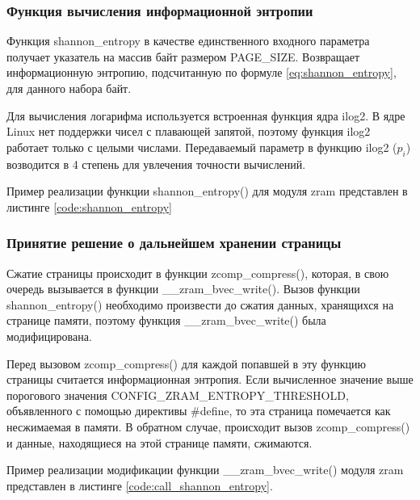 \subsubsection{Функция вычисления информационной энтропии}

Функция shannon\_entropy в качестве единственного входного параметра получает указатель на массив байт размером PAGE\_SIZE. Возвращает информационную энтропию, подсчитанную по формуле \ref{eq:shannon_entropy}, для данного набора байт.

Для вычисления логарифма используется встроенная функция ядра ilog2. В ядре Linux нет поддержки чисел с плавающей запятой, поэтому функция ilog2 работает только с целыми числами. Передаваемый параметр в функцию ilog2 ($p_{i}$) возводится в 4 степень для увлечения точности вычислений.

Пример реализации функции shannon\_entropy() для модуля zram представлен в листинге \ref{code:shannon_entropy}


\subsubsection{Принятие решение о дальнейшем хранении страницы}

Сжатие страницы происходит в функции zcomp\_compress(), которая, в свою очередь вызывается в функции \_\_zram\_bvec\_write(). Вызов функции\\ shannon\_entropy() необходимо произвести до сжатия данных, хранящихся на странице памяти, поэтому функция \_\_zram\_bvec\_write() была модифицирована. 

Перед вызовом zcomp\_compress() для каждой попавшей в эту функцию страницы считается информационная энтропия. Если вычисленное значение выше порогового значения CONFIG\_ZRAM\_ENTROPY\_THRESHOLD, объявленного с помощью директивы \#define, то эта страница помечается как несжимаемая в памяти. В обратном случае, происходит вызов zcomp\_compress() и данные, находящиеся на этой странице памяти, сжимаются. 

Пример реализации модификации функции \_\_zram\_bvec\_write() модуля zram представлен в листинге \ref{code:call_shannon_entropy}.

